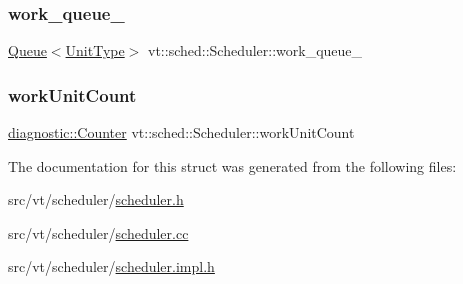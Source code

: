 \mbox{\label{structvt_1_1sched_1_1_scheduler_a8176bae441897c36b86e3fb917496a7a}} 
\subsubsection{\texorpdfstring{work\+\_\+queue\+\_\+}{work\_queue\_}}
{\footnotesize\ttfamily \hyperlink{structvt_1_1sched_1_1_queue}{Queue}$<$\hyperlink{structvt_1_1sched_1_1_scheduler_a398229f29b0940cea85aba4bae78b0be}{Unit\+Type}$>$ vt\+::sched\+::\+Scheduler\+::work\+\_\+queue\+\_\+\hspace{0.3cm}{\ttfamily [private]}}

\mbox{\label{structvt_1_1sched_1_1_scheduler_a1b22d8a8efd0cb27fdba01ae616e060b}} 
\subsubsection{\texorpdfstring{work\+Unit\+Count}{workUnitCount}}
{\footnotesize\ttfamily \hyperlink{namespacevt_1_1diagnostic_a55fcc9d6ffa285d1b085c01df2507d2f}{diagnostic\+::\+Counter} vt\+::sched\+::\+Scheduler\+::work\+Unit\+Count\hspace{0.3cm}{\ttfamily [private]}}



The documentation for this struct was generated from the following files\+:\begin{DoxyCompactItemize}
\item 
src/vt/scheduler/\hyperlink{scheduler_8h}{scheduler.\+h}\item 
src/vt/scheduler/\hyperlink{scheduler_8cc}{scheduler.\+cc}\item 
src/vt/scheduler/\hyperlink{scheduler_8impl_8h}{scheduler.\+impl.\+h}\end{DoxyCompactItemize}
